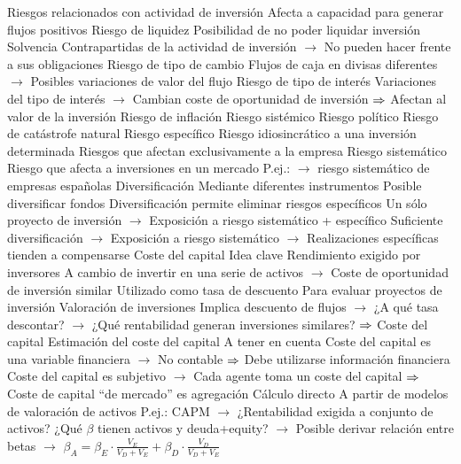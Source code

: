 \documentclass{nuevotema}
\begin{document}
\begin{esquemal}
				\4[] Riesgos relacionados con actividad de inversión
				\4[] Afecta a capacidad para generar flujos positivos
				\4 Riesgo de liquidez
				\4[] Posibilidad de no poder liquidar inversión
				\4 Solvencia
				\4[] Contrapartidas de la actividad de inversión
				\4[] $\to$ No pueden hacer frente a sus obligaciones
				\4 Riesgo de tipo de cambio
				\4[] Flujos de caja en divisas diferentes
				\4[] $\to$ Posibles variaciones de valor del flujo
				\4 Riesgo de tipo de interés
				\4[] Variaciones del tipo de interés
				\4[] $\to$ Cambian coste de oportunidad de inversión
				\4[] $\Rightarrow$ Afectan al valor de la inversión
				\4 Riesgo de inflación
				\4 Riesgo sistémico
				\4 Riesgo político
				\4 Riesgo de catástrofe natural
			\3 Riesgo específico
				\4 Riesgo idiosincrático a una inversión determinada
				\4 Riesgos que afectan exclusivamente a la empresa
			\3 Riesgo sistemático
				\4 Riesgo que afecta a inversiones en un mercado
				\4[] P.ej.:
				\4[] $\to$ riesgo sistemático de empresas españolas
			\3 Diversificación
				\4 Mediante diferentes instrumentos
				\4[] Posible diversificar fondos
				\4 Diversificación permite eliminar riesgos específicos
				\4[] Un sólo proyecto de inversión
				\4[] $\to$ Exposición a riesgo sistemático + específico
				\4[] Suficiente diversificación
				\4[] $\to$ Exposición a riesgo sistemático
				\4[] $\to$ Realizaciones específicas tienden a compensarse
		\2 Coste del capital
			\3 Idea clave
				\4 Rendimiento exigido por inversores
				\4[] A cambio de invertir en una serie de activos
				\4[] $\to$ Coste de oportunidad de inversión similar
				\4 Utilizado como tasa de descuento
				\4[] Para evaluar proyectos de inversión
				\4 Valoración de inversiones
				\4[] Implica descuento de flujos
				\4[] $\to$ ¿A qué tasa descontar?
				\4[] $\to$ ¿Qué rentabilidad generan inversiones similares?
				\4[] $\Rightarrow$ Coste del capital
			\3 Estimación del coste del capital
				\4 A tener en cuenta
				\4[] Coste del capital es una variable financiera
				\4[] $\to$ No contable
				\4[] $\Rightarrow$ Debe utilizarse información financiera
				\4[] Coste del capital es subjetivo
				\4[] $\to$ Cada agente toma un coste del capital
				\4[] $\Rightarrow$ Coste de capital ``de mercado'' es agregación
				\4 Cálculo directo
				\4[] A partir de modelos de valoración de activos
				\4[] P.ej.: CAPM
				\4[] $\to$ ¿Rentabilidad exigida a conjunto de activos?
				\4[] ¿Qué $\beta$ tienen activos y deuda+equity?
				\4[] $\to$ Posible derivar relación entre betas
				\4[] $\to$ $\beta_A = \beta_E \cdot \frac{V_E}{V_D+V_E} + \beta_D \cdot \frac{V_D}{V_D+V_E}$

\end{esquemal}
\end{document}
